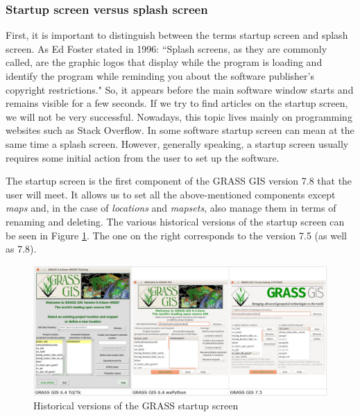 \documentclass[a4paper,10pt,twoside]{article}
\begin{document}
\subsubsection{Startup screen versus splash screen}
\label{subsection:mechanism}
\noindent
\large
First, it is important to distinguish between the terms startup screen and splash screen. As Ed Foster stated in 1996: ``Splash screens, as they are commonly called, are the graphic logos that display while the program is loading and identify the program while reminding you about the software publisher's copyright restrictions." So, it appears before the main software window starts and remains visible for a few seconds. If we try to find articles on the startup screen, we will not be very successful. Nowadays, this topic lives mainly on programming websites such as Stack Overflow. In some software startup screen can mean at the same time a splash screen. However, generally speaking, a startup screen usually requires some initial action from the user to set up the software. 

The startup screen is the first component of the GRASS GIS version 7.8 that the user will meet. It allows us to set all the above-mentioned components except \textit{maps} and, in the case of \textit{locations} and \textit{mapsets}, also manage them in terms of renaming and deleting. The various historical versions of the startup screen can be seen in Figure \ref{fig:verze_startup}. The one on the right corresponds to the version 7.5 (as well as 7.8).

\vspace{0.3cm}
\begin{figure}[hbt!]
\begin{center}
\includegraphics[width=15cm]{../pictures/verze_startup.png} 
\caption[Historical versions of the GRASS startup screen]{Historical versions of the GRASS startup screen}
\label{fig:verze_startup}
\end{center}
\end{figure}
\end{document}
